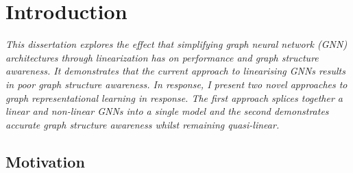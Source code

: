 \chapter{Introduction}


\emph{
    This dissertation explores the effect that simplifying graph neural network (GNN) architectures through linearization has on performance and graph structure awareness.
    It demonstrates that the current approach to linearising GNNs results in poor graph structure awareness. In response, I present two novel approaches to graph representational learning in response.
    The first approach splices together a linear and non-linear GNNs into a single model and the second demonstrates accurate graph structure awareness whilst remaining quasi-linear.
}

\section{Motivation}
\label{sec:motivation}






